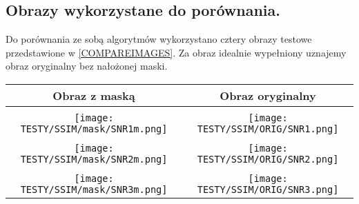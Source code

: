 \documentclass[12pt, twoside, openany]{report}
\theoremstyle{definition}
\begin{document}
\subsection{Obrazy wykorzystane do porównania.}
Do porównania ze sobą algorytmów wykorzystano cztery obrazy testowe przedstawione w \autoref{COMPAREIMAGES}. Za obraz idealnie wypełniony uznajemy obraz oryginalny bez nałożonej maski.
\begin{longtable}[h!]{|c|c|}
    \hline
    Obraz z maską & Obraz oryginalny \\ \hline

    \multicolumn{2}{|c|}{
		\SNRI
    } \\ \hline 
    \begin{minipage}{0.5\textwidth}
    \vspace{0.2cm}
    \centering
    \texttt{[image: TESTY/SSIM/mask/SNR1m.png]}
    \vspace{0.2cm}
    \end{minipage}
	&
    \begin{minipage}{0.5\textwidth}
    \vspace{0.2cm}
    \centering
    \texttt{[image: TESTY/SSIM/ORIG/SNR1.png]}
    \vspace{0.2cm}
    \end{minipage}\\ \hline

    \multicolumn{2}{|c|}{
		\SNRII
    } \\ \hline 
    \begin{minipage}{0.5\textwidth}
    \vspace{0.2cm}
    \centering
    \texttt{[image: TESTY/SSIM/mask/SNR2m.png]}
    \vspace{0.2cm}
    \end{minipage}
	&
    \begin{minipage}{0.5\textwidth}
    \vspace{0.2cm}
    \centering
    \texttt{[image: TESTY/SSIM/ORIG/SNR2.png]}
    \vspace{0.2cm}
    \end{minipage}\\ \hline

    \multicolumn{2}{|c|}{
		\SNRIII
    } \\ \hline 
    \begin{minipage}{0.5\textwidth}
    \vspace{0.2cm}
    \centering
    \texttt{[image: TESTY/SSIM/mask/SNR3m.png]}
    \vspace{0.2cm}
    \end{minipage}
	&
    \begin{minipage}{0.5\textwidth}
    \vspace{0.2cm}
    \centering
    \texttt{[image: TESTY/SSIM/ORIG/SNR3.png]}
    \vspace{0.2cm}
    \end{minipage}\\ \hline


\end{longtable}
\end{document}
